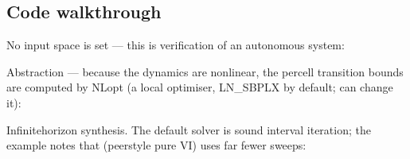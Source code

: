 \documentclass[a4paper,10pt,english]{sphinxmanual}
\begin{document}
\subsection{Code walkthrough}
\label{\detokenize{benchmarks/VP:code-walkthrough}}
\sphinxAtStartPar
No input space is set — this is verification of an autonomous system:

\begin{sphinxVerbatim}[commandchars=\\\{\}]
\end{sphinxVerbatim}

\sphinxAtStartPar
Abstraction — because the dynamics are nonlinear, the per\sphinxhyphen{}cell transition bounds are
computed by NLopt (a local optimiser, LN\_SBPLX by default;  can change
it):

\begin{sphinxVerbatim}[commandchars=\\\{\}]
\end{sphinxVerbatim}

\sphinxAtStartPar
Infinite\sphinxhyphen{}horizon synthesis. The default solver is sound interval iteration; the
example notes that  (peer\sphinxhyphen{}style pure VI) uses far fewer sweeps:
\end{document}
